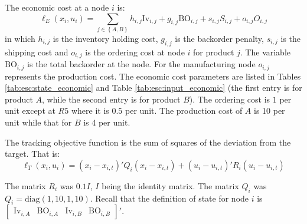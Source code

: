 \documentclass{elsarticle}
\newcommand{\set}[1]{\left\lbrace #1 \right\rbrace}
\newcommand{\BO}{\textrm{BO}}
\newcommand{\Inv}{\textrm{Iv}}
\theoremstyle{definition}
\begin{document}
The economic  cost at a node $i$ is:
\[ \ell_E(x_i,u_i) =  \sum_{j \in \set{A,B}}h_{i,j} \Inv_{i,j} + g_{i,j} \BO_{i,j} + s_{i,j} S_{i,j} + o_{i,j} O_{i,j} \]
in which $h_{i,j}$ is the inventory holding cost, $g_{i,j}$ is the backorder penalty, $s_{i,j}$ is the shipping cost and $o_{i,j}$ is the ordering cost at node $i$ for product $j$.  The variable $\BO_{i,j}$ is the total backorder at the node. For the manufacturing node $o_{i,j}$ represents the production cost. The economic cost parameters are listed in Tables \ref{tab:esc:state_economic} and Table \ref{tab:esc:input_economic} (the first entry is for product $A$, while the second entry is for product $B$).  The ordering cost is $1$ per unit except at $R5$ where it is $0.5$ per unit. The production cost of $A$ is 10 per unit while that for $B$ is 4 per unit.


The tracking objective function is the sum of squares of the deviation from the target. That is:
\[\ell_T(x_i,u_i) = (x_i-x_{i,t})'Q_i( x_i-x_{i,t}) + (u_i-u_{i,t})'R_i(u_i-u_{i,t})\]

The matrix $R_i$ was $0.1I$, $I$ being the identity matrix. The matrix
$Q_i$ was $Q_i = \text{diag}(1,10,1,10)$. Recall that the definition
of state for node $i$ is $\begin{bmatrix} \Inv_{i,A} & \BO_{i,A} &
  \Inv_{i,B} &   \BO_{i,B} \end{bmatrix}'$. 
\end{document}
